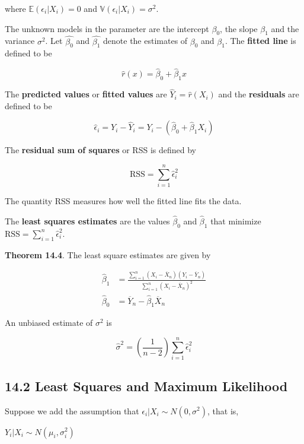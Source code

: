 where \(\mathbb{E}(\epsilon_{i} | X_{i}) = 0\) and
\(\mathbb{V}(\epsilon_{i} | X_{i}) = \sigma^{2}\).

The unknown models in the parameter are the intercept \(\beta_{0}\), the
slope \(\beta_{1}\) and the variance \(\sigma^{2}\). Let \(\hat{\beta_{0}}\)
and \(\hat{\beta_{1}}\) denote the estimates of \(\beta_{0}\) and
\(\beta_{1}\). The \textbf{fitted line} is defined to be

\[\hat{r}(x) = \hat{\beta}_{0} + \hat{\beta}_{1} x\]

The \textbf{predicted values} or \textbf{fitted values} are
\(\hat{Y}_{i} = \hat{r}(X_{i})\) and the \textbf{residuals} are defined to
be

\[\hat{\epsilon}_{i} = Y_{i} - \hat{Y}_{i} = Y_{i} - (\hat{\beta}_{0} + \hat{\beta}_{1} X_{i})\]

The \textbf{residual sum of squares} or RSS is defined by

\[ \text{RSS} = \sum_{i=1}^{n} \hat{\epsilon}_{i}^{2}\]

The quantity RSS measures how well the fitted line fits the data.

The \textbf{least squares estimates} are the values \(\hat{\beta}_{0}\)
and \(\hat{\beta}_{1}\) that minimize
\(\text{RSS} = \sum_{i=1}^{n} \hat{\epsilon}_{i}^{2}\).

\textbf{Theorem 14.4}. The least square estimates are given by

\begin{align*}
\hat{\beta}_{1} &= \frac{\sum_{i=1}^{n} (X_{i} - \overline{X}_{n}) (Y_{i} - \overline{Y}_{n})}{\sum_{i=1}^{n} (X_{i} - \overline{X}_{n})^{2}}\\
\hat{\beta}_{0} &= \overline{Y}_{n} - \hat{\beta}_{1} \overline{X}_{n}
\end{align*}

An unbiased estimate of \(\sigma^{2}\) is

\[
\hat{\sigma}^{2} = \left( \frac{1}{n - 2} \right) \sum_{i=1}^{n} \hat{\epsilon}_{i}^{2}
\]

\subsection*{14.2 Least Squares and Maximum
Likelihood}\label{least-squares-and-maximum-likelihood}

Suppose we add the assumption that
\(\epsilon_{i} | X_{i} \sim N(0, \sigma^{2})\), that is,

\(Y_{i} | X_{i} \sim N(\mu_{i}, \sigma_{i}^{2})\)

